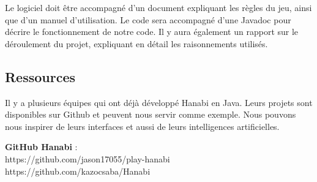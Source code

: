 \documentclass{article}
\begin{document}
Le logiciel doit être accompagné d’un document expliquant les règles du jeu, ainsi que d’un manuel d’utilisation. Le code sera accompagné d'une Javadoc pour décrire le fonctionnement de notre code. Il y aura également un rapport sur le déroulement du projet, expliquant en détail les raisonnements utilisés.

\subsection{Ressources}

Il y a plusieurs équipes qui ont déjà développé Hanabi en Java. Leurs projets sont disponibles sur Github et peuvent nous servir comme exemple. Nous pouvons nous inspirer de leurs interfaces et aussi de leurs intelligences artificielles.


{\bfseries GitHub Hanabi} :\\
https://github.com/jason17055/play-hanabi\\
https://github.com/kazocsaba/Hanabi
\end{document}
